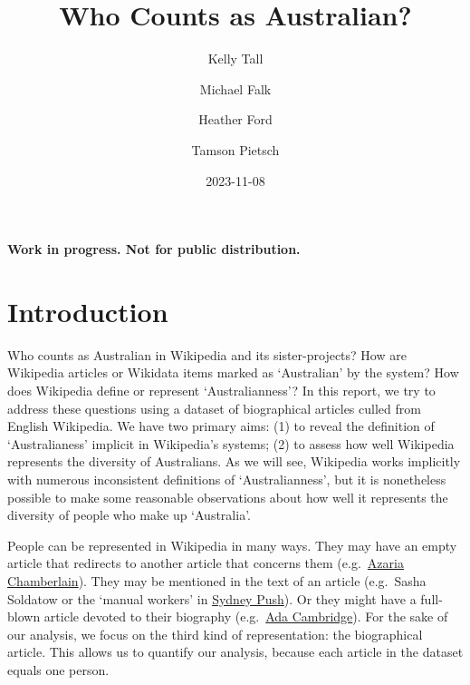 \documentclass[
  a4paper,
  DIV=11,
  numbers=noendperiod]{scrreprt}
\title{Who Counts as Australian?}
\author{Kelly Tall \and Michael Falk \and Heather Ford \and Tamson
Pietsch}
\date{2023-11-08}
\renewcommand*\contentsname{Table of contents}
\newcommand\contentsname{Table of contents}
\begin{document}
\maketitle
\ifdefined\Shaded\renewenvironment{Shaded}{\begin{tcolorbox}[sharp corners, interior hidden, frame hidden, boxrule=0pt, breakable, borderline west={3pt}{0pt}{shadecolor}, enhanced]}{\end{tcolorbox}}\fi

\renewcommand*\contentsname{Table of contents}
{
\hypersetup{linkcolor=}
\setcounter{tocdepth}{2}
\tableofcontents
}
\textbf{Work in progress. Not for public distribution.}

\hypertarget{introduction}{%
\chapter{Introduction}\label{introduction}}

Who counts as Australian in Wikipedia and its sister-projects? How are
Wikipedia articles or Wikidata items marked as `Australian' by the
system? How does Wikipedia define or represent `Australianness'? In this
report, we try to address these questions using a dataset of
biographical articles culled from English Wikipedia. We have two primary
aims: (1) to reveal the definition of `Australianess' implicit in
Wikipedia's systems; (2) to assess how well Wikipedia represents the
diversity of Australians. As we will see, Wikipedia works implicitly
with numerous inconsistent definitions of `Australianness', but it is
nonetheless possible to make some reasonable observations about how well
it represents the diversity of people who make up `Australia'.

People can be represented in Wikipedia in many ways. They may have an
empty article that redirects to another article that concerns them
(e.g.~\href{https://en.wikipedia.org/wiki/Azaria_Chamberlain}{Azaria
Chamberlain}). They may be mentioned in the text of an article
(e.g.~Sasha Soldatow or the `manual workers' in
\href{https://en.wikipedia.org/w/index.php?title=Sydney_Push\&oldid=1151477281}{Sydney
Push}). Or they might have a full-blown article devoted to their
biography (e.g.~\href{https://en.wikipedia.org/wiki/Ada_Cambridge}{Ada
Cambridge}). For the sake of our analysis, we focus on the third kind of
representation: the biographical article. This allows us to quantify our
analysis, because each article in the dataset equals one person.
\end{document}

